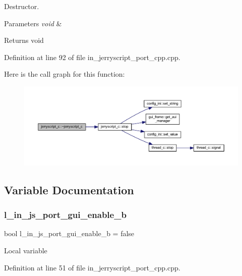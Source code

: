 Destructor. 


\begin{DoxyParams}{Parameters}
{\em void} & \\
\hline
\end{DoxyParams}
\begin{DoxyReturn}{Returns}
void 
\end{DoxyReturn}


Definition at line 92 of file in\+\_\+jerryscript\+\_\+port\+\_\+cpp.\+cpp.

Here is the call graph for this function\+:
\nopagebreak
\begin{figure}[H]
\begin{center}
\leavevmode
\includegraphics[width=350pt]{group___port_ga70bc4dccdb6382c8245155b6f09189e1_cgraph}
\end{center}
\end{figure}


\subsection{Variable Documentation}
\mbox{\label{group___port_gad52187b22dd0de50cb3dfe7dae1a4e4d}} 
\subsubsection{l\_in\_js\_port\_gui\_enable\_b}
{\footnotesize\ttfamily bool l\+\_\+in\+\_\+js\+\_\+port\+\_\+gui\+\_\+enable\+\_\+b = false}

Local variable 

Definition at line 51 of file in\+\_\+jerryscript\+\_\+port\+\_\+cpp.\+cpp.

